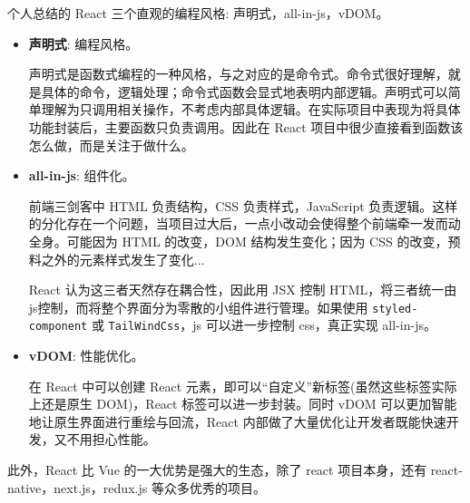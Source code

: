 个人总结的 React 三个直观的编程风格: 声明式，all-in-js，vDOM。
\begin{itemize}
    \item \textbf{声明式}: 编程风格。
    
    声明式是函数式编程的一种风格，与之对应的是命令式。命令式很好理解，就是具体的命令，逻辑处理；命令式函数会显式地表明内部逻辑。声明式可以简单理解为只调用相关操作，不考虑内部具体逻辑。在实际项目中表现为将具体功能封装后，主要函数只负责调用。因此在 React 项目中很少直接看到函数该怎么做，而是关注于做什么。
    \item \textbf{all-in-js}: 组件化。
    
    前端三剑客中 HTML 负责结构，CSS 负责样式，JavaScript 负责逻辑。这样的分化存在一个问题，当项目过大后，一点小改动会使得整个前端牵一发而动全身。可能因为 HTML 的改变，DOM 结构发生变化；因为 CSS 的改变，预料之外的元素样式发生了变化...
    
    React 认为这三者天然存在耦合性，因此用 JSX 控制 HTML，将三者统一由js控制，而将整个界面分为零散的小组件进行管理。如果使用 \texttt{styled-component} 或 \texttt{TailWindCss}，js 可以进一步控制 css，真正实现 all-in-js。

    \item \textbf{vDOM}: 性能优化。
    
    在 React 中可以创建 React 元素，即可以“自定义”新标签(虽然这些标签实际上还是原生 DOM)，React 标签可以进一步封装。同时 vDOM 可以更加智能地让原生界面进行重绘与回流，React 内部做了大量优化让开发者既能快速开发，又不用担心性能。
\end{itemize}

此外，React 比 Vue 的一大优势是强大的生态，除了 react 项目本身，还有 react-native，next.js，redux.js 等众多优秀的项目。

\newpage